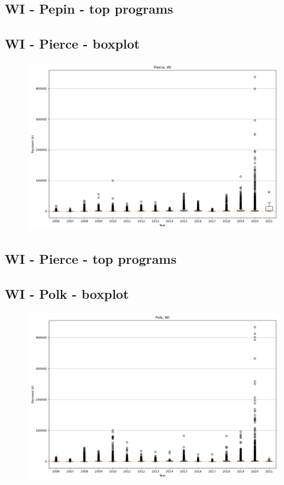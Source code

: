 \subsection*{WI - Pepin - top programs}

\newpage
\subsection*{WI - Pierce - boxplot}
\begin{figure}[h]
\centering
\includegraphics[width=7in]{../output/boxplots/counties/Pierce-WI_boxplot.png}
\end{figure}


\subsection*{WI - Pierce - top programs}

\newpage
\subsection*{WI - Polk - boxplot}
\begin{figure}[h]
\centering
\includegraphics[width=7in]{../output/boxplots/counties/Polk-WI_boxplot.png}
\end{figure}


